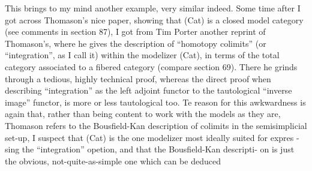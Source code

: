 This brings to my mind another example, very similar indeed.
Some time after I got across Thomason's nice paper, showing that
(Cat) is a closed model category (see comments in section 87), I got
from Tim Porter another  reprint of Thomason's, where he gives the
description of ``homotopy colimits'' (or ``integration'', as I call it)
within the modelizer (Cat), in terms of the total category
associated to a fibered category (compare section 69). There he grinds
through a tedious, highly technical proof, whereas the direct proof
when describing ``integration'' as the left adjoint functor to the
tautological ``inverse image'' functor, is more or less tautological
too. Te reason for this awkwardness is again that, rather than
being content to work with the models as they are, Thomason refers to
the Bousfield-Kan description of colimits in the semisimplicial set-up, 
I suspect that (Cat) is the one modelizer most ideally suited for expres%
-sing the ``integration'' opetion, and that the Bousfield-Kan descripti-%
on is just the obvious, not-quite-as-simple one which can be deduced

